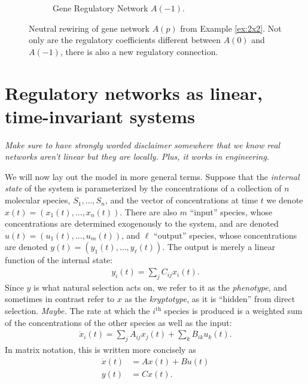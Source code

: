 \documentclass[11 pt]{article}
\newcommand{\plr}[1]{{\color{blue}\it #1}}
\newcommand{\ddt}{\dot}
\begin{document}
\begin{figure}
\begin{subfigure}{0.5\textwidth}
\begin{tikzpicture}
\end{tikzpicture}
    \caption{Gene Regulatory Network $A(-1)$.}
  \end{subfigure}
  \caption{Neutral rewiring of gene network $A(p)$ from Example \ref{ex:2x2}. Not only are the regulatory coefficients different between $A(0)$ and $A(-1)$, there is also a new regulatory connection.}
\end{figure}


\section{Regulatory networks as linear, time-invariant systems}

\plr{Make sure to have strongly worded disclaimer somewhere
that we know real networks aren't linear
but they are locally.
Plus, it works in engineering.}


We will now lay out the model in more general terms.
Suppose that the \emph{internal state} of the system
is parameterized by the concentrations of a collection of $n$ molecular species,
$S_1, \ldots, S_n$,
and the vector of concentrations at time $t$ we denote $x(t)=(x_1(t),\ldots,x_n(t))$.
There are also $m$ ``input'' species, whose concentrations are determined
exogenously to the system,
and are denoted $u(t) = (u_1(t),\ldots,u_m(t))$,
and $\ell$ ``output'' species, whose concentrations are denoted
$y(t) = (y_1(t),\ldots,y_\ell(t))$.
The output is merely a linear function of the internal state:
\begin{align*}
    y_i(t) = \sum_j C_{ij} x_i(t).
\end{align*}
Since $y$ is what natural selection acts on, we refer to it as the \emph{phenotype},
and sometimes in contrast refer to $x$ as the \emph{kryptotype},
as it is ``hidden'' from direct selection.
\plr{Maybe.}
The rate at which the $i^\text{th}$ species is produced
is a weighted sum of the concentrations of the other species
as well as the input:
\begin{align*}
    \ddt x_i(t) = \sum_j A_{ij} x_j(t) + \sum_k B_{ik} u_k(t) .
\end{align*}
In matrix notation, this is written more concisely as
\begin{align} \label{eqn:lti_system}
    \ddt x(t) &= A x(t) + B u(t) \\
    y(t) &= C x(t) .
\end{align}
\end{document}
